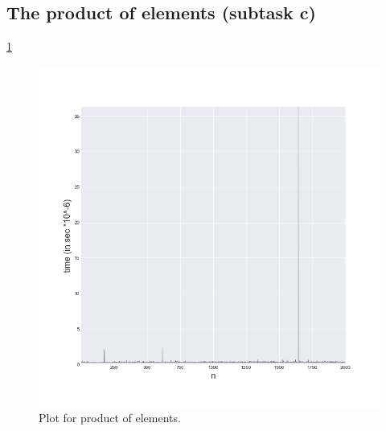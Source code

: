 \documentclass[a4paper,article,14pt]{extarticle}
\begin{document}
	\subsection{The product of elements (subtask c)}
	\ref{product}
	\begin{figure}[h]
		\centering
		\includegraphics[scale=0.5]{productOfVector.png}
		\caption{Plot for product of elements.}
		\label{product}
	\end{figure} 
	
\end{document}

